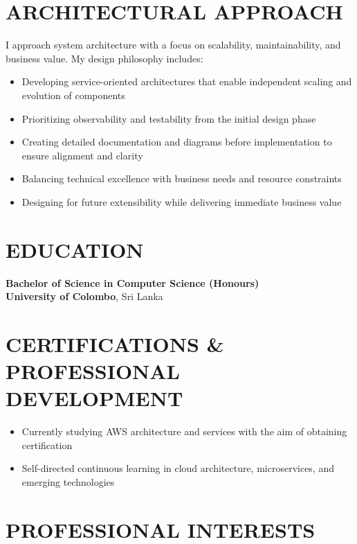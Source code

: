 \documentclass{fullstackdeveloper-ats}
\begin{document}
\section{ARCHITECTURAL APPROACH}
I approach system architecture with a focus on scalability, maintainability, and business value. My design philosophy includes:
\begin{itemize}
    \item Developing service-oriented architectures that enable independent scaling and evolution of components
    \item Prioritizing observability and testability from the initial design phase
    \item Creating detailed documentation and diagrams before implementation to ensure alignment and clarity
    \item Balancing technical excellence with business needs and resource constraints
    \item Designing for future extensibility while delivering immediate business value
\end{itemize}

\section{EDUCATION}

\noindent\textbf{Bachelor of Science in Computer Science (Honours)} \hfill {}\\
\textbf{University of Colombo}, Sri Lanka

\section{CERTIFICATIONS \& PROFESSIONAL DEVELOPMENT}
\begin{itemize}
    \item Currently studying AWS architecture and services with the aim of obtaining certification
    \item Self-directed continuous learning in cloud architecture, microservices, and emerging technologies
\end{itemize}

\section{PROFESSIONAL INTERESTS}
\end{document}
